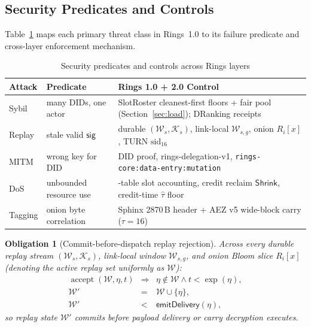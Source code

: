\documentclass[journal]{IEEEtran}
\newtheorem{obligation}{Obligation}
\DeclareRobustCommand{\code}[1]{{\ttfamily\renewcommand{\_}{\textunderscore\allowbreak}#1}}
\begin{document}
\subsection{Security Predicates and Controls}

Table~\ref{security-table} maps each primary threat class in Rings~1.0 to its failure predicate and cross-layer enforcement mechanism.

\begin{table}[htbp]
\centering
\caption{Security predicates and controls across Rings layers}
\label{security-table}
\footnotesize
\setlength{\tabcolsep}{3pt}
\begin{tabular}{@{}p{1.2cm}>{\raggedright\arraybackslash}p{2.2cm}>{\raggedright\arraybackslash}p{4.3cm}@{}}
\toprule
Attack & Predicate & Rings 1.0 + 2.0 Control \\ \midrule
Sybil & many DIDs, one actor & \code{SlotRoster} cleanest-first floors + fair pool (Section~\ref{sec:load}); DRanking receipts~\cite{RingsDRanking2026} \\
Replay & stale valid $\mathsf{sig}$ & durable $(\mathcal{W}_s,\mathcal{K}_s)$, link-local $\mathcal{W}_{s,g}$, onion $R_i[x]$, TURN $\mathrm{sid}_{16}$ \\
MITM & wrong key for DID & DID proof, \code{rings-delegation-v1}, \texttt{rings-core:\allowbreak data-entry:\allowbreak mutation} \\
DoS & unbounded resource use & 5-table slot accounting, credit reclaim $\mathsf{Shrink}$, credit-time $\hat{\tau}$ floor \\
Tagging & onion byte correlation & Sphinx 2870\,B header + AEZ v5 wide-block carry ($\tau=16$) \\
\bottomrule
\end{tabular}
\end{table}

\begin{obligation}[Commit-before-dispatch replay rejection]
Across every durable replay stream $(\mathcal{W}_s,\mathcal{K}_s)$, link-local window $\mathcal{W}_{s,g}$, and onion Bloom slice $R_i[x]$ (denoting the active replay set uniformly as $\mathcal{W}$):
\[
\begin{array}{rcl}
\operatorname{accept}(\mathcal{W},\eta,t)
&\Rightarrow&
  \eta\notin \mathcal{W}\land t<\operatorname{exp}(\eta),\\
\mathcal{W}'&=&\mathcal{W}\cup\{\eta\},\\
\mathcal{W}'&<&\mathsf{emitDelivery}(\eta),
\end{array}
\]
so replay state $\mathcal{W}'$ commits before payload delivery or carry decryption executes.
\end{obligation}
\end{document}
